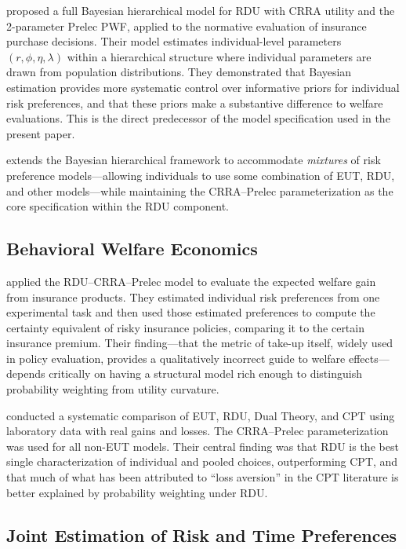 \documentclass[12pt,a4paper]{article}
\begin{document}
\textcite{Gao2022} proposed a full Bayesian hierarchical model for RDU with
CRRA utility and the 2-parameter Prelec PWF, applied to the normative
evaluation of insurance purchase decisions. Their model estimates
individual-level parameters $(r, \phi, \eta, \lambda)$ within a hierarchical
structure where individual parameters are drawn from population distributions.
They demonstrated that Bayesian estimation provides more systematic control
over informative priors for individual risk preferences, and that these priors
make a substantive difference to welfare evaluations. This is the direct
predecessor of the model specification used in the present paper.

\textcite{Harrison2025} extends the Bayesian hierarchical framework to
accommodate \textit{mixtures} of risk preference models---allowing individuals
to use some combination of EUT, RDU, and other models---while maintaining the
CRRA--Prelec parameterization as the core specification within the RDU
component.

\subsection{Behavioral Welfare Economics}

\textcite{Harrison2016} applied the RDU--CRRA--Prelec model to evaluate the
expected welfare gain from insurance products. They estimated individual risk
preferences from one experimental task and then used those estimated
preferences to compute the certainty equivalent of risky insurance policies,
comparing it to the certain insurance premium. Their finding---that the metric
of take-up itself, widely used in policy evaluation, provides a qualitatively
incorrect guide to welfare effects---depends critically on having a structural
model rich enough to distinguish probability weighting from utility curvature.

\textcite{HarrisonSwarthout2023} conducted a systematic comparison of EUT,
RDU, Dual Theory, and CPT using laboratory data with real gains and losses. The
CRRA--Prelec parameterization was used for all non-EUT models. Their central
finding was that RDU is the best single characterization of individual and
pooled choices, outperforming CPT, and that much of what has been attributed to
``loss aversion'' in the CPT literature is better explained by probability
weighting under RDU.

\subsection{Joint Estimation of Risk and Time Preferences}
\end{document}
